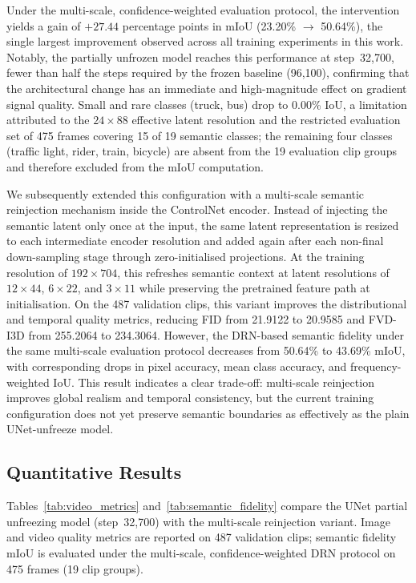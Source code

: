 Under the multi-scale, confidence-weighted evaluation protocol, the intervention yields a gain of $+27.44$ percentage points in mIoU (23.20\% $\rightarrow$ 50.64\%), the single largest improvement observed across all training experiments in this work. Notably, the partially unfrozen model reaches this performance at step~32,700, fewer than half the steps required by the frozen baseline (96,100), confirming that the architectural change has an immediate and high-magnitude effect on gradient signal quality. Small and rare classes (truck, bus) drop to 0.00\% IoU, a limitation attributed to the $24 \times 88$ effective latent resolution and the restricted evaluation set of 475 frames covering 15 of 19 semantic classes; the remaining four classes (traffic light, rider, train, bicycle) are absent from the 19 evaluation clip groups and therefore excluded from the mIoU computation.

We subsequently extended this configuration with a multi-scale semantic reinjection mechanism inside the ControlNet encoder. Instead of injecting the semantic latent only once at the input, the same latent representation is resized to each intermediate encoder resolution and added again after each non-final down-sampling stage through zero-initialised projections. At the training resolution of $192 \times 704$, this refreshes semantic context at latent resolutions of $12 \times 44$, $6 \times 22$, and $3 \times 11$ while preserving the pretrained feature path at initialisation. On the 487 validation clips, this variant improves the distributional and temporal quality metrics, reducing FID from 21.9122 to 20.9585 and FVD-I3D from 255.2064 to 234.3064. However, the DRN-based semantic fidelity under the same multi-scale evaluation protocol decreases from 50.64\% to 43.69\% mIoU, with corresponding drops in pixel accuracy, mean class accuracy, and frequency-weighted IoU. This result indicates a clear trade-off: multi-scale reinjection improves global realism and temporal consistency, but the current training configuration does not yet preserve semantic boundaries as effectively as the plain UNet-unfreeze model.

\subsection{Quantitative Results}
\label{subsec:stage2_quantitative}

Tables~\ref{tab:video_metrics} and~\ref{tab:semantic_fidelity} compare the UNet partial unfreezing model (step~32,700) with the multi-scale reinjection variant. Image and video quality metrics are reported on 487 validation clips; semantic fidelity mIoU is evaluated under the multi-scale, confidence-weighted DRN protocol on 475 frames (19 clip groups).

